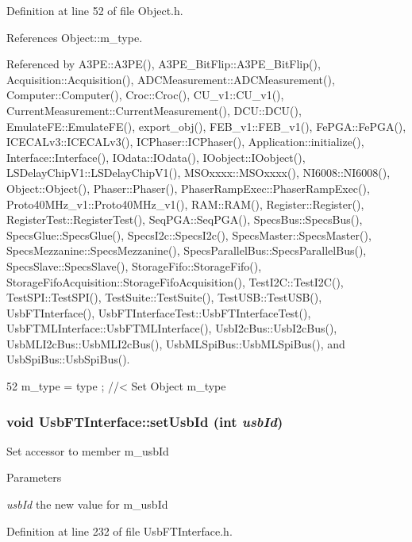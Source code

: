 Definition at line 52 of file Object.h.

References Object::m\_\-type.

Referenced by A3PE::A3PE(), A3PE\_\-BitFlip::A3PE\_\-BitFlip(), Acquisition::Acquisition(), ADCMeasurement::ADCMeasurement(), Computer::Computer(), Croc::Croc(), CU\_\-v1::CU\_\-v1(), CurrentMeasurement::CurrentMeasurement(), DCU::DCU(), EmulateFE::EmulateFE(), export\_\-obj(), FEB\_\-v1::FEB\_\-v1(), FePGA::FePGA(), ICECALv3::ICECALv3(), ICPhaser::ICPhaser(), Application::initialize(), Interface::Interface(), IOdata::IOdata(), IOobject::IOobject(), LSDelayChipV1::LSDelayChipV1(), MSOxxxx::MSOxxxx(), NI6008::NI6008(), Object::Object(), Phaser::Phaser(), PhaserRampExec::PhaserRampExec(), Proto40MHz\_\-v1::Proto40MHz\_\-v1(), RAM::RAM(), Register::Register(), RegisterTest::RegisterTest(), SeqPGA::SeqPGA(), SpecsBus::SpecsBus(), SpecsGlue::SpecsGlue(), SpecsI2c::SpecsI2c(), SpecsMaster::SpecsMaster(), SpecsMezzanine::SpecsMezzanine(), SpecsParallelBus::SpecsParallelBus(), SpecsSlave::SpecsSlave(), StorageFifo::StorageFifo(), StorageFifoAcquisition::StorageFifoAcquisition(), TestI2C::TestI2C(), TestSPI::TestSPI(), TestSuite::TestSuite(), TestUSB::TestUSB(), UsbFTInterface(), UsbFTInterfaceTest::UsbFTInterfaceTest(), UsbFTMLInterface::UsbFTMLInterface(), UsbI2cBus::UsbI2cBus(), UsbMLI2cBus::UsbMLI2cBus(), UsbMLSpiBus::UsbMLSpiBus(), and UsbSpiBus::UsbSpiBus().


\begin{DoxyCode}
52 { m_type  = type  ; } //< Set Object m_type
\end{DoxyCode}
\hypertarget{classUsbFTInterface_a6718c98c2b6d5924b6722e81f93f25f0}{
\subsubsection[{setUsbId}]{\setlength{\rightskip}{0pt plus 5cm}void UsbFTInterface::setUsbId (int {\em usbId})}}
\label{classUsbFTInterface_a6718c98c2b6d5924b6722e81f93f25f0}
Set accessor to member m\_\-usbId 
\begin{DoxyParams}{Parameters}
\item[{\em usbId}]the new value for m\_\-usbId \end{DoxyParams}


Definition at line 232 of file UsbFTInterface.h.

